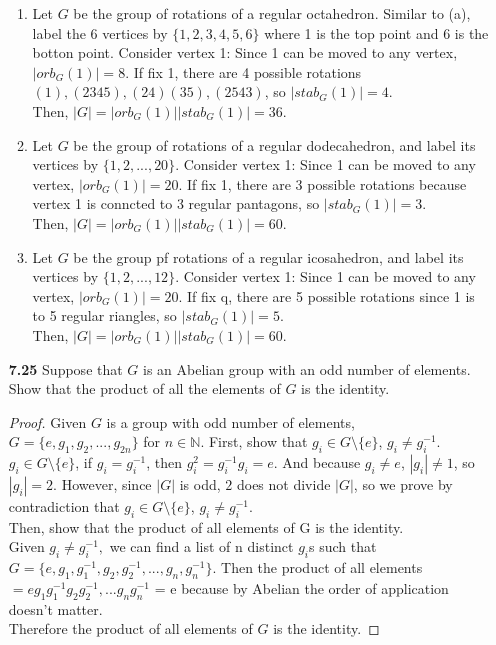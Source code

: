 \documentclass[11pt, one side]{article}
\newcommand{\N}{\mathbb N}
\begin{document}
\begin{enumerate}
\begin{enumerate}
\item Let $G$ be the group of rotations of a regular octahedron. Similar to (a), label the 6 vertices by $\{1,2,3,4,5,6\}$ where 1 is the top point and 6 is the botton point. Consider vertex 1: 
Since 1 can be moved to any vertex, $|orb_G(1)|=8 $. If fix 1, there are 4 possible rotations $(1), (2345), (24)(35), (2543)$, so $|stab_G(1)|= 4.$ \\
Then, $|G|=|orb_G(1)||stab_G(1)|=36.$\\

\item Let $G$ be the group of rotations of a regular dodecahedron, and label its vertices by $\{1,2,...,20\}.$ Consider vertex 1: Since 1 can be moved to any vertex, $|orb_G(1)|=20.$ If fix 1, there are 3 possible rotations because vertex 1 is conncted to 3 regular pantagons, so $|stab_G(1)|= 3.$\\
Then, $|G|=|orb_G(1)||stab_G(1)|=60.$\\

\item Let $G$ be the group pf rotations of a regular icosahedron, and label its vertices by $\{1, 2,..., 12\}.$ Consider vertex 1: Since 1 can be moved to any vertex, $|orb_G(1)|=20.$ If fix q, there are 5 possible rotations since 1 is to 5 regular riangles, so $|stab_G(1)|= 5$.\\
Then, $|G|=|orb_G(1)||stab_G(1)|=60.$

\end{enumerate}

\pagebreak

\item[{\bf 7.25}] Suppose that $G$ is an Abelian group with an odd number of elements. Show that the product of all the elements of $G$ is the identity.

\begin{proof}
Given $G$ is a group with odd number of elements, $G = \{ e, g_1, g_2, ... ,g_{2n}\}$ for $n \in \N.$ First, show that \forall $ g_i \in G\setminus\{e\}$, $g_i \neq g_i^{-1}.$ \\ \forall $ g_i \in G\setminus\{e\}$, if $g_i = g_i^{-1}$, then $g_i^{2}=g_i^{-1}g_i=e$. And because $g_i\neq e$, $|g_i|\neq 1$, so $|g_i|=2.$ However, since $|G|$ is odd, $2$ does not divide $|G|$, so we prove by contradiction that \forall $ g_i \in G\setminus\{e\}$, $g_i \neq g_i^{-1}.$ \\
Then, show that the product of all elements of G is the identity.\\
Given $g_i\neq g_i^{-1},$ we can find a list of n distinct $g_i$s such that $G = \{e, g_1, g_1^{-1}, g_2, g_2^{-1},..., g_n, g_n^{-1}\}.$ Then the product of all elements $= eg_1g_1^{-1}g_2g_2^{-1},...g_ng_n^{-1}$ = e because by Abelian the order of application doesn't matter.\\
Therefore the product of all elements of $G$ is the identity.
\end{proof}


\end{enumerate}
\end{document}
